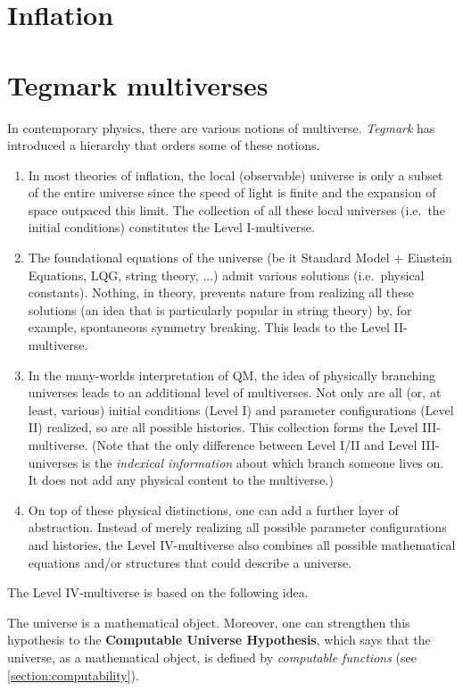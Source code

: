 
\section{Inflation}


\section{Tegmark multiverses}

    In contemporary physics, there are various notions of multiverse. \textit{Tegmark} has introduced a hierarchy that orders some of these notions.

    \begin{enumerate}
        \item In most theories of inflation, the local (observable) universe is only a subset of the entire universe since the speed of light is finite and the expansion of space outpaced this limit. The collection of all these local universes (i.e.~the initial conditions) constitutes the Level I-multiverse.
        \item The foundational equations of the universe (be it Standard Model + Einstein Equations, LQG, string theory, ...) admit various solutions (i.e.~physical constants). Nothing, in theory, prevents nature from realizing all these solutions (an idea that is particularly popular in string theory) by, for example, spontaneous symmetry breaking. This leads to the Level II-multiverse.
        \item In the many-worlds interpretation of QM, the idea of physically branching universes leads to an additional level of multiverses. Not only are all (or, at least, various) initial conditions (Level I) and parameter configurations (Level II) realized, so are all possible histories. This collection forms the Level III-multiverse. (Note that the only difference between Level I/II and Level III-universes is the \textit{indexical information} about which branch someone lives on. It does not add any physical content to the multiverse.)
        \item On top of these physical distinctions, one can add a further layer of abstraction. Instead of merely realizing all possible parameter configurations and histories, the Level IV-multiverse also combines all possible mathematical equations and/or structures that could describe a universe.
    \end{enumerate}

    The Level IV-multiverse is based on the following idea.
    \begin{axiom}
        The universe is a mathematical object. Moreover, one can strengthen this hypothesis to the \textbf{Computable Universe Hypothesis}, which says that the universe, as a mathematical object, is defined by \textit{computable functions} (see \cref{section:computability}).
    \end{axiom}